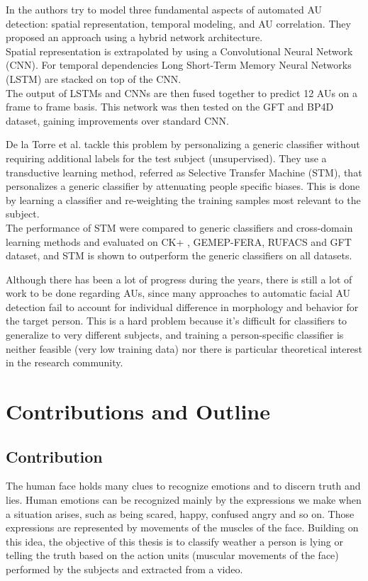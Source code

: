 In \cite{AU_LSTM} the authors try to model three fundamental aspects of automated AU detection: spatial representation, temporal modeling, and AU correlation. They proposed an approach using a hybrid network architecture. \\
Spatial representation is extrapolated by using a Convolutional Neural Network (CNN). For temporal dependencies Long Short-Term Memory Neural Networks (LSTM) are stacked on top of the CNN. \\
The output of LSTMs and CNNs are then fused together to predict 12 AUs on a frame to frame basis. This network was then tested on the GFT and BP4D \cite{BP4D-Spontaneous} dataset, gaining improvements over standard CNN.

De la Torre et al. \cite{AU_STM} \cite{AU_STM2} tackle this problem by personalizing a generic classifier without requiring additional labels for the test subject (unsupervised). They use a transductive learning method, referred as Selective Transfer Machine (STM), that personalizes a generic classifier by attenuating people specific biases. This is done by  learning a classifier and re-weighting the training samples most relevant to the subject. \\
The performance of STM were compared to generic classifiers and cross-domain learning methods and evaluated on CK+ \cite{CK+}, GEMEP-FERA, RUFACS and GFT dataset, and STM is shown to outperform the generic classifiers on all datasets.

Although there has been a lot of progress during the years, there is still a lot of work to be done regarding AUs, since many approaches to automatic facial AU detection fail to account for individual difference in morphology and behavior for the target person. This is a hard problem because it's difficult for classifiers to generalize to very different subjects, and training a person-specific classifier is neither feasible (very low training data) nor there is particular theoretical interest in the research community. 

\clearpage

\section{Contributions and Outline} \label{contrib}

\subsection{Contribution}
The human face holds many clues to recognize emotions and to discern truth and lies. Human emotions can be recognized mainly by the expressions we make when a situation arises, such as being scared, happy, confused angry and so on. Those expressions are represented by movements of the muscles of the face. Building on this idea, the objective of this thesis is to classify weather a person is lying or telling the truth based on the action units (muscular movements of the face) performed by the subjects and extracted from a video. 

